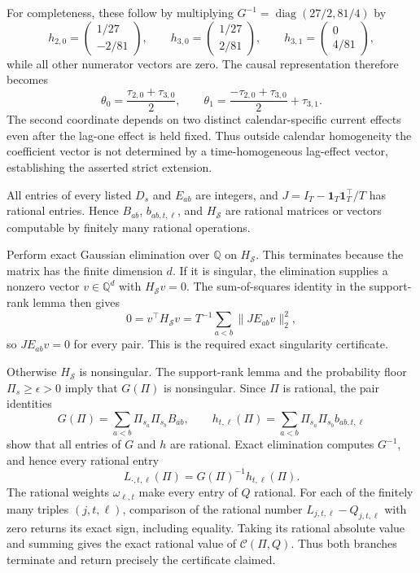 For completeness, these follow by multiplying \(G^{-1}=\operatorname{diag}(27/2,81/4)\) by
\[
 h_{2,0}=\begin{pmatrix}1/27\\-2/81\end{pmatrix},\qquad
 h_{3,0}=\begin{pmatrix}1/27\\2/81\end{pmatrix},\qquad
 h_{3,1}=\begin{pmatrix}0\\4/81\end{pmatrix},
\]
while all other numerator vectors are zero.  The causal representation therefore becomes
\[
 \theta_0=\frac{\tau_{2,0}+\tau_{3,0}}2,
 \qquad
 \theta_1=\frac{-\tau_{2,0}+\tau_{3,0}}2+\tau_{3,1}.
\]
The second coordinate depends on two distinct calendar-specific current effects even after the lag-one effect is held fixed.  Thus outside calendar homogeneity the coefficient vector is not determined by a time-homogeneous lag-effect vector, establishing the asserted strict extension.

All entries of every listed \(D_s\) and \(E_{ab}\) are integers, and
\(
J=I_T-\mathbf 1_T\mathbf 1_T^{\top}/T
\)
has rational entries.  Hence \(B_{ab}\), \(b_{ab,t,\ell}\), and \(H_{\mathcal S}\) are rational matrices or vectors computable by finitely many rational operations.

Perform exact Gaussian elimination over \(\mathbb Q\) on \(H_{\mathcal S}\).  This terminates because the matrix has the finite dimension \(d\).  If it is singular, the elimination supplies a nonzero vector \(v\in\mathbb Q^d\) with \(H_{\mathcal S}v=0\).  The sum-of-squares identity in the support-rank lemma then gives
\[
 0=v^{\top}H_{\mathcal S}v
   =T^{-1}\sum_{a<b}\lVert JE_{ab}v\rVert_2^2,
\]
so \(JE_{ab}v=0\) for every pair.  This is the required exact singularity certificate.

Otherwise \(H_{\mathcal S}\) is nonsingular.  The support-rank lemma and the probability floor \(\Pi_s\geq\epsilon>0\) imply that \(G(\Pi)\) is nonsingular.  Since \(\Pi\) is rational, the pair identities
\[
 G(\Pi)=\sum_{a<b}\Pi_{s_a}\Pi_{s_b}B_{ab},
 \qquad
 h_{t,\ell}(\Pi)=\sum_{a<b}\Pi_{s_a}\Pi_{s_b}b_{ab,t,\ell}
\]
show that all entries of \(G\) and \(h\) are rational.  Exact elimination computes \(G^{-1}\), and hence every rational entry
\[
 L_{\cdot,t,\ell}(\Pi)=G(\Pi)^{-1}h_{t,\ell}(\Pi).
\]
The rational weights \(\omega_{\ell,t}\) make every entry of \(Q\) rational.  For each of the finitely many triples \((j,t,\ell)\), comparison of the rational number \(L_{j,t,\ell}-Q_{j,t,\ell}\) with zero returns its exact sign, including equality.  Taking its rational absolute value and summing gives the exact rational value of \(\mathcal C(\Pi,Q)\).  Thus both branches terminate and return precisely the certificate claimed.

